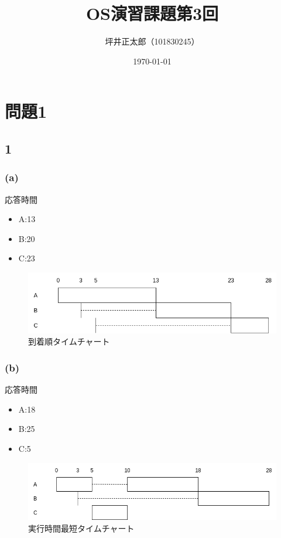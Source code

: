 \documentclass[a4paper,10pt]{jsarticle}
\begin{document}
\title{OS演習課題第3回}
\author{坪井正太郎（101830245）}
\date{\today}
\maketitle
\section*{問題1}

\subsection*{1}

\subsubsection*{(a)}
応答時間
\begin{itemize}
  \item A:13
  \item B:20
  \item C:23
\end{itemize}

\begin{figure}[H]
  \centering
  \includegraphics[width=\linewidth]{./01.drawio.png}
  \caption{到着順タイムチャート}
  \label{到着順タイムチャート}
\end{figure}

\subsubsection*{(b)}
応答時間
\begin{itemize}
  \item A:18
  \item B:25
  \item C:5
\end{itemize}

\begin{figure}[H]
  \centering
  \includegraphics[width=\linewidth]{./02.drawio.png}
  \caption{実行時間最短タイムチャート}
  \label{実行時間最短タイムチャート}
\end{figure}
\end{document}
